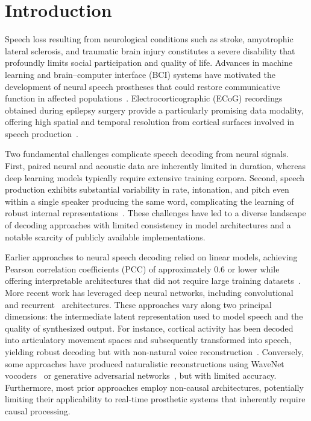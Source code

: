 \documentclass[11pt]{article}
\begin{document}
\section{Introduction}

Speech loss resulting from neurological conditions such as stroke, amyotrophic lateral sclerosis, and traumatic brain injury constitutes a severe disability that profoundly limits social participation and quality of life. Advances in machine learning and brain--computer interface (BCI) systems have motivated the development of neural speech prostheses that could restore communicative function in affected populations~\citep{moses2021neuroprosthesis, metzger2023high, willett2023high, anumanchipalli2019speech, makin2020machine}. Electrocorticographic (ECoG) recordings obtained during epilepsy surgery provide a particularly promising data modality, offering high spatial and temporal resolution from cortical surfaces involved in speech production~\citep{herff2015brain, angrick2019speech, mugler2014direct, bouchard2013functional}.

Two fundamental challenges complicate speech decoding from neural signals. First, paired neural and acoustic data are inherently limited in duration, whereas deep learning models typically require extensive training corpora. Second, speech production exhibits substantial variability in rate, intonation, and pitch even within a single speaker producing the same word, complicating the learning of robust internal representations~\citep{chartier2018encoding, hickok2012cortical}. These challenges have led to a diverse landscape of decoding approaches with limited consistency in model architectures and a notable scarcity of publicly available implementations.

Earlier approaches to neural speech decoding relied on linear models, achieving Pearson correlation coefficients (PCC) of approximately 0.6 or lower while offering interpretable architectures that did not require large training datasets~\citep{herff2015brain, wilson2020decoding}. More recent work has leveraged deep neural networks, including convolutional~\citep{angrick2019speech} and recurrent~\citep{anumanchipalli2019speech, makin2020machine} architectures. These approaches vary along two principal dimensions: the intermediate latent representation used to model speech and the quality of synthesized output. For instance, cortical activity has been decoded into articulatory movement spaces and subsequently transformed into speech, yielding robust decoding but with non-natural voice reconstruction~\citep{anumanchipalli2019speech}. Conversely, some approaches have produced naturalistic reconstructions using WaveNet vocoders~\citep{angrick2019speech} or generative adversarial networks~\citep{akbari2019towards}, but with limited accuracy. Furthermore, most prior approaches employ non-causal architectures, potentially limiting their applicability to real-time prosthetic systems that inherently require causal processing.
\end{document}
